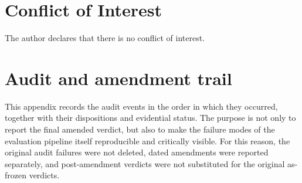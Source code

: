 \documentclass{article}
\numberwithin{equation}{section}  %
\theoremstyle{definition}
\begin{document}
\section*{Conflict of Interest}

The author declares that there is no conflict of interest.



\appendix

\section{Audit and amendment trail}
\label{app:audit}

This appendix records the audit events in the order in which they occurred, together with
their dispositions and evidential status. The purpose is not only to report the final amended
verdict, but also to make the failure modes of the evaluation pipeline itself reproducible and
critically visible. For this reason, the original audit failures were not deleted, dated
amendments were reported separately, and post-amendment verdicts were not substituted for the
original as-frozen verdicts.
\end{document}

